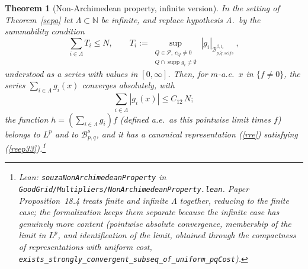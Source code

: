 \documentclass[11pt]{amsart}
\newtheorem{theorem}{Theorem}[section]
\theoremstyle{definition}
\newcommand{\lean}[1]{\texttt{#1}}
\begin{document}
\begin{theorem}[Non-Archimedean property, infinite version]\label{sepainf}
In the setting of Theorem~\ref{sepa} let $\Lambda \subset \mathbb{N}$ be
infinite, and replace hypothesis A.\ by the summability condition
$$\sum_{i \in \Lambda} T_i \leq N, \qquad
T_i := \sup_{\substack{ Q\in \mathcal{P},\ c_Q\neq 0 \\ Q\cap \operatorname{supp} g_i \neq \emptyset}}
|g_i|_{ \mathcal{B}^{\beta,t_i}_{p,\tilde{q},selfs}}\ ,$$
understood as a series with values in $[0,\infty]$. Then, for $m$-a.e.\ $x$
in $\{f \neq 0\}$, the series $\sum_{i\in\Lambda} g_i(x)$ converges
absolutely, with
$$\sum_{i\in\Lambda} |g_i(x)| \leq C_{12}\, N;$$
the function
$h = (\sum_{i\in\Lambda} g_i) f$ (defined a.e.\ as this pointwise limit
times $f$) belongs to $L^p$ and to $\mathcal{B}^s_{p,q}$, and it has a
canonical representation (\ref{rre}) satisfying
(\ref{reep33}).\footnote{Lean: \lean{souzaNonArchimedeanProperty} in
\lean{GoodGrid/Multipliers/NonArchimedeanProperty.lean}. Paper
Proposition~18.4 treats finite and infinite $\Lambda$ together, reducing to
the finite case; the formalization keeps them separate because the infinite
case has genuinely more content (pointwise absolute convergence, membership
of the limit in $L^p$, and identification of the limit, obtained through the
compactness of representations with uniform cost,
\lean{exists\_strongly\_convergent\_subseq\_of\_uniform\_pqCost}).}
\end{theorem}
\end{document}
